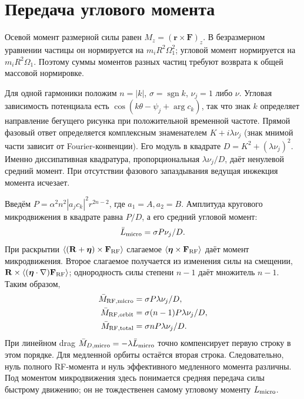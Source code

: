 \documentclass[aip,cha,reprint,a4paper,amsmath,amssymb]{revtex4-2}
\begin{document}
\section{Передача углового момента}
Осевой момент размерной силы равен $M_z=(\mathbf r\times\mathbf F)_z$. В безразмерном уравнении частицы он нормируется на $m_iR^2\Omega_1^2$; угловой момент нормируется на $m_iR^2\Omega_1$. Поэтому суммы моментов разных частиц требуют возврата к общей массовой нормировке.

Для одной гармоники положим $n=|k|$, $\sigma=\operatorname{sgn}k$, $\nu_j=1$ либо $\nu$. Угловая зависимость потенциала есть $\cos(k\theta-\psi_j+\arg c_k)$, так что знак $k$ определяет направление бегущего рисунка при положительной временной частоте. Прямой фазовый ответ определяется комплексным знаменателем $K+i\lambda\nu_j$ (знак мнимой части зависит от Fourier-конвенции). Его модуль в квадрате $D=K^2+(\lambda\nu_j)^2$. Именно диссипативная квадратура, пропорциональная $\lambda\nu_j/D$, даёт ненулевой средний момент. При отсутствии фазового запаздывания ведущая инжекция момента исчезает.

Введём $P=\alpha^2n^2|a_jc_k|^2r^{2n-2}$, где $a_1=A,a_2=B$. Амплитуда кругового микродвижения в квадрате равна $P/D$, а его средний угловой момент:
\begin{equation}\bar L_{\rm micro}=\sigma P\nu_j/D.\end{equation}
При раскрытии $\langle(\mathbf R+\boldsymbol\eta)\times\mathbf F_{\rm RF}\rangle$ слагаемое $\langle\boldsymbol\eta\times\mathbf F_{\rm RF}\rangle$ даёт момент микродвижения. Второе слагаемое получается из изменения силы на смещении, $\mathbf R\times\langle(\boldsymbol\eta\cdot\nabla)\mathbf F_{\rm RF}\rangle$; однородность силы степени $n-1$ даёт множитель $n-1$. Таким образом,
\begin{equation}\begin{aligned}
\bar M_{\rm RF,micro}&=\sigma P\lambda\nu_j/D,\\
\bar M_{\rm RF,orbit}&=\sigma(n-1)P\lambda\nu_j/D,\\
\bar M_{\rm RF,total}&=\sigma nP\lambda\nu_j/D.
\end{aligned}\end{equation}
При линейном drag $\bar M_{D,\rm micro}=-\lambda\bar L_{\rm micro}$ точно компенсирует первую строку в этом порядке. Для медленной орбиты остаётся вторая строка. Следовательно, нуль полного RF-момента и нуль эффективного медленного момента различны. Под моментом микродвижения здесь понимается средняя передача силы быстрому движению; он не тождественен самому угловому моменту $L_{\rm micro}$.
\end{document}
